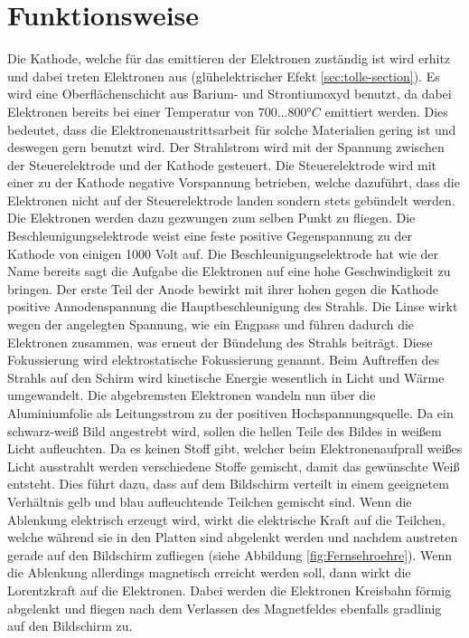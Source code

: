 \section{Funktionsweise}
Die Kathode, welche für das emittieren der Elektronen zuständig ist wird erhitz und dabei treten Elektronen aus (glühelektrischer Efekt \ref{sec:tolle-section}).
Es wird eine Oberflächenschicht aus Barium- und Strontiumoxyd benutzt, da  dabei Elektronen bereits bei einer Temperatur von $700...800°C$ emittiert werden.
Dies bedeutet, dass die Elektronenaustrittsarbeit für solche Materialien gering ist und deswegen gern benutzt wird.
Der Strahlstrom wird mit der Spannung zwischen der Steuerelektrode und der Kathode gesteuert.
Die Steuerelektrode wird mit einer zu der Kathode negative Vorspannung betrieben, welche dazuführt, dass die Elektronen nicht auf der Steuerelektrode landen sondern stets gebündelt werden.
Die Elektronen werden dazu gezwungen zum selben Punkt zu fliegen.
Die Beschleunigungselektrode weist eine feste positive Gegenspannung zu der Kathode von einigen 1000 Volt auf. 
Die Beschleunigungselektrode hat wie der Name bereits sagt die Aufgabe die Elektronen auf eine hohe Geschwindigkeit zu bringen.
Der erste Teil der Anode bewirkt mit ihrer hohen gegen die Kathode positive Annodenspannung die Hauptbeschleunigung des Strahls.
Die Linse wirkt wegen der angelegten Spannung, wie ein Engpass und führen dadurch die Elektronen zusammen, was erneut der Bündelung des Strahls beiträgt.
Diese Fokussierung wird elektrostatische Fokussierung genannt.
Beim Auftreffen des Strahls auf den Schirm wird kinetische Energie wesentlich in Licht und Wärme umgewandelt.
Die abgebremsten Elektronen wandeln nun über die Aluminiumfolie als Leitungsstrom zu der positiven Hochspannungsquelle.
Da ein schwarz-weiß Bild angestrebt wird, sollen die hellen Teile des Bildes in weißem Licht aufleuchten.
Da es keinen Stoff gibt, welcher beim Elektronenaufprall weißes Licht ausstrahlt werden verschiedene Stoffe gemischt, damit das gewünschte Weiß entsteht.
Dies führt dazu, dass auf dem Bildschirm verteilt in einem geeignetem Verhältnis gelb und blau aufleuchtende Teilchen gemischt sind.
Wenn die Ablenkung elektrisch erzeugt wird, wirkt die elektrische Kraft auf die Teilchen, welche während sie in den Platten sind abgelenkt werden und nachdem austreten gerade auf den Bildschirm zufliegen (siehe Abbildung \ref{fig:Fernsehroehre}).
Wenn die Ablenkung allerdings magnetisch erreicht werden soll, dann wirkt die Lorentzkraft auf die Elektronen.
Dabei werden die Elektronen Kreisbahn förmig abgelenkt und fliegen nach dem Verlassen des Magnetfeldes ebenfalls gradlinig auf den Bildschirm zu.
